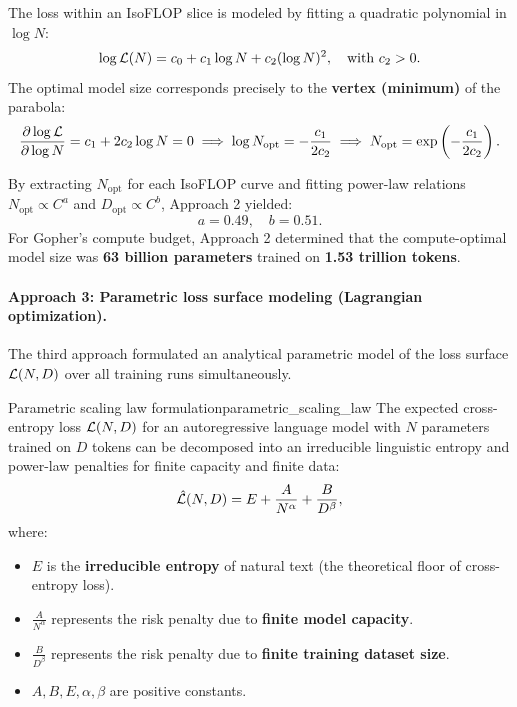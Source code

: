 \documentclass[../../main.tex]{subfiles}
\begin{document}
The loss within an IsoFLOP slice is modeled by fitting a quadratic polynomial in $\log N$:
\begin{equation}
\label{eq:isoflop_parabola}
\log \mathcal{L}(N) = c_0 + c_1 \log N + c_2 (\log N)^2, \quad \text{with } c_2 > 0.
\end{equation}
The optimal model size corresponds precisely to the \textbf{vertex (minimum)} of the parabola:
\begin{equation}
\label{eq:parabola_vertex}
\frac{\partial \log \mathcal{L}}{\partial \log N} = c_1 + 2 c_2 \log N = 0 \implies \log N_{\text{opt}} = -\frac{c_1}{2 c_2} \implies N_{\text{opt}} = \exp\left(-\frac{c_1}{2 c_2}\right).
\end{equation}

By extracting $N_{\text{opt}}$ for each IsoFLOP curve and fitting power-law relations $N_{\text{opt}} \propto C^a$ and $D_{\text{opt}} \propto C^b$, Approach 2 yielded:
\begin{equation}
a = 0.49, \quad b = 0.51.
\end{equation}
For Gopher's compute budget, Approach 2 determined that the compute-optimal model size was \textbf{63 billion parameters} trained on \textbf{1.53 trillion tokens}.

\paragraph{Approach 3: Parametric loss surface modeling (Lagrangian optimization).}
The third approach formulated an analytical parametric model of the loss surface $\mathcal{L}(N, D)$ over all training runs simultaneously.

\begin{theorem}{Parametric scaling law formulation}{parametric_scaling_law}
The expected cross-entropy loss $\mathcal{L}(N, D)$ for an autoregressive language model with $N$ parameters trained on $D$ tokens can be decomposed into an irreducible linguistic entropy and power-law penalties for finite capacity and finite data:
\begin{equation}
\label{eq:chinchilla_parametric_loss}
\hat{\mathcal{L}}(N, D) = E + \frac{A}{N^\alpha} + \frac{B}{D^\beta},
\end{equation}
where:
\begin{itemize}
    \item $E$ is the \textbf{irreducible entropy} of natural text (the theoretical floor of cross-entropy loss).
    \item $\frac{A}{N^\alpha}$ represents the risk penalty due to \textbf{finite model capacity}.
    \item $\frac{B}{D^\beta}$ represents the risk penalty due to \textbf{finite training dataset size}.
    \item $A, B, E, \alpha, \beta$ are positive constants.
\end{itemize}
\end{theorem}
\end{document}
